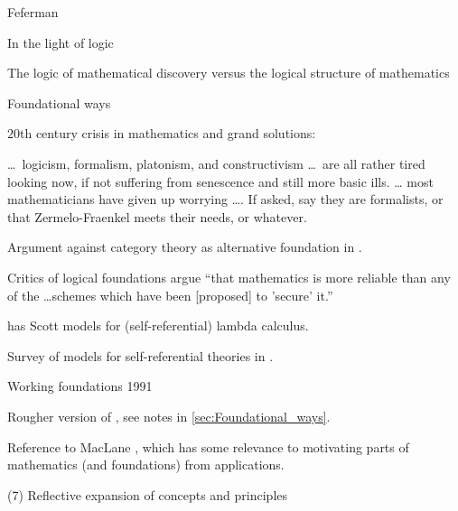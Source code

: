 \begin{plSection}{Feferman}
\begin{plSection}{In the light of logic}
\begin{plSection}{The logic of mathematical discovery 
versus the logical structure of mathematics}
\end{plSection}%
\begin{plSection}{Foundational ways}
\label{sec:Foundational_ways}


$20$th century crisis in mathematics and grand solutions:
\begin{plQuote}{}{}
\ldots\ logicism, formalism, platonism, and constructivism \ldots\
are all rather tired looking now, if not suffering from
senescence and still more basic ills. \ldots
most mathematicians have given up worrying \dots .
If asked, say they are formalists, or that
Zermelo-Fraenkel meets their needs, or whatever.
\end{plQuote}

Argument against category theory as alternative 
foundation in .

Critics of logical foundations argue ``that mathematics
is more reliable than any of the \ldots schemes which have been
[proposed] to 'secure' it.''

\cite[ch~4, p~99]{Feferman:1998:LightOfLogic} has
Scott models for (self-referential) lambda 
calculus. 

Survey of models for self-referential theories in 
.

\end{plSection}%
\begin{plSection}{Working foundations 1991}
\label{sec:Working_foundations_1991}


Rougher version of \cite[ch~4]{Feferman:1998:LightOfLogic},
see notes in \cref{sec:Foundational_ways}.

Reference to MacLane ,
which has some relevance to motivating
parts of mathematics (and foundations)
from applications.

\end{plSection}%
\begin{plSection}{(7) Reflective expansion of concepts and principles}


\end{plSection}
\end{plSection}
\end{plSection}
